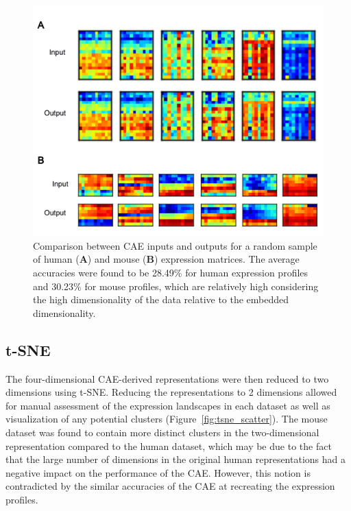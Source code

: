 \documentclass[12pt,oneside,onecolumn,a4paper]{article}
\begin{document}
\begin{figure}[H]
\begin{center}
\includegraphics[width=\columnwidth]{figures/input_output}
\caption{Comparison between CAE inputs and outputs for a random sample of human (\textbf{A}) and mouse (\textbf{B}) expression matrices. The average accuracies were found to be 28.49\% for human expression profiles and 30.23\% for mouse profiles, which are relatively high considering the high dimensionality of the data relative to the embedded dimensionality. \label{fig:input_output}%
}
\end{center}
\end{figure}

\subsection{t-SNE}

The four-dimensional CAE-derived representations were then reduced to two dimensions using t-SNE. Reducing the representations to 2 dimensions allowed for manual assessment of the expression landscapes in each dataset as well as visualization of any potential clusters (Figure~\ref{fig:tsne_scatter}). The mouse dataset was found to contain more distinct clusters in the two-dimensional representation compared to the human dataset, which may be due to the fact that the large number of dimensions in the original human representations had a negative impact on the performance of the CAE. However, this notion is contradicted by the similar accuracies of the CAE at recreating the expression profiles.
\end{document}
